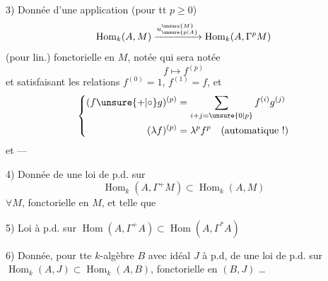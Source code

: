 
3) Donnée d'une application (pour tt $p\geq 0$)
\[
\operatorname{Hom}_k(A,M)\xrightarrow{u_{\unsure{p|A}}^{\unsure{M}}}\operatorname{Hom}_k(A,\Gamma^pM)
\]
(pour lin.) fonctorielle en $M$, notée
 qui  sera notée
\[
f\longmapsto f^{(p)}
\]
et satisfaisant les relations $f^{(0)}=1$, $f^{(1)}=f$, et
\[
\left\{\begin{aligned}
(f\unsure{+|{\circ}}g)^{(p)}&=\sum_{i+j=\unsure{0|p}}f^{(i)}g^{(j)}\\
(\lambda f)^{(p)}&=\lambda^p f^p\quad\text{(automatique !)}
\end{aligned}\right.
\]
et ---

4) Donnée de une loi de p.d. sur
\[
\operatorname{Hom}_k(A,\Gamma^+M)\subset\operatorname{Hom}_k(A,M)
\]
$\forall M$, fonctorielle en $M$, et telle que

5) Loi à p.d. sur $\operatorname{Hom}(A,\Gamma^+A)\subset\operatorname{Hom}(A,\Gamma^{\ast}A)$

6) Donnée, pour tte $k$-algèbre $B$  avec
idéal $J$ à p.d, de une loi de
p.d. sur $\operatorname{Hom}_k(A,J)\subset\operatorname{Hom}_k(A,B)$,
fonctorielle en $(B,J)$ \ldots
